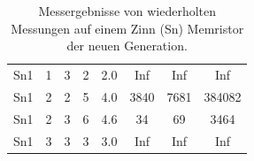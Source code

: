 \begin{table}
\begin{tabular}{l|c|c|c|c|c|c|c}
       Sn1           &  1               & 3                &  2               &  2.0           & Inf            & Inf            & Inf     \\
       Sn1           &  2               & 2                &  5               &  4.0           & 3840           & 7681           & 384082  \\
       Sn1           &  2               & 3                &  6               &  4.6           & 34             & 69             & 3464    \\
       Sn1           &  3               & 3                &  3               &  3.0           & Inf            & Inf            & Inf     \\
    \end{tabular}
  \caption{Messergebnisse von wiederholten Messungen auf einem Zinn (Sn) Memristor der neuen Generation.}
  \label{tab:Messergebnisse_Sn}
\end{table}

